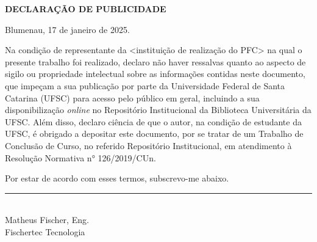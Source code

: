 
\begin{center}
	\textbf{DECLARAÇÃO DE PUBLICIDADE}
\end{center}


Blumenau, 17 de janeiro de 2025.

\vspace{1cm}

Na condição de representante da <instituição de realização do PFC> na qual o presente trabalho foi realizado, declaro não haver ressalvas quanto ao aspecto de sigilo ou propriedade intelectual sobre as informações contidas neste documento, que impeçam a sua publicação por parte da Universidade Federal de Santa Catarina (UFSC) para acesso pelo público em geral, incluindo a sua disponibilização \emph{online} no Repositório Institucional da Biblioteca Universitária da UFSC. Além disso, declaro ciência de que o autor, na condição de estudante da UFSC, é obrigado a depositar este documento, por se tratar de um Trabalho de Conclusão de Curso, no referido Repositório Institucional, em atendimento à Resolução Normativa n° 126/2019/CUn.

Por estar de acordo com esses termos, subscrevo-me abaixo.

\vspace{15mm}

\begin{center}
	\rule{7cm}{0.7pt} \\
	Matheus Fischer, Eng. \\
	Fischertec Tecnologia
\end{center}

\cleardoublepage


	
